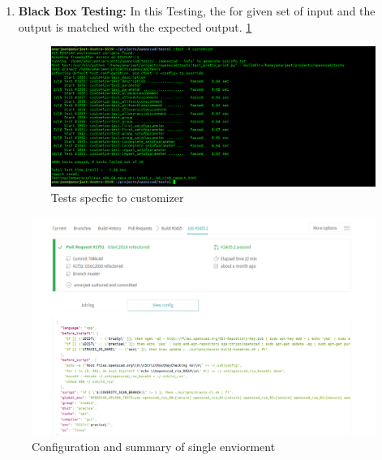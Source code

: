 \begin{enumerate}
     \item \textbf{Black Box Testing:} In this Testing, the for given set of input and the output is matched with the expected output. \ref{fig:ctest}
   
     \begin{figure}
         \centering
         \includegraphics[width=\linewidth]{images/ctest}
         \caption{Tests specfic to customizer}
         \label{fig:ctest}
     \end{figure}
   
 \end{enumerate}

\begin{figure}
    \centering
    \includegraphics[width=\linewidth]{images/travisSpecific}
    \caption{Configuration and summary of single enviorment}
    \label{fig:travisSpecific}
\end{figure}
 
